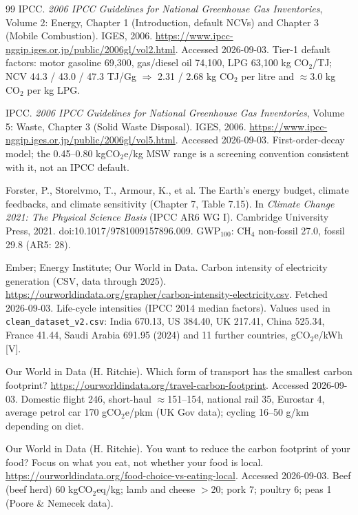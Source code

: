 \documentclass[11pt,a4paper]{article}
\begin{document}
\begin{thebibliography}{99}
IPCC. \textit{2006 IPCC Guidelines for National Greenhouse Gas Inventories}, Volume 2: Energy, Chapter 1 (Introduction, default NCVs) and Chapter 3 (Mobile Combustion). IGES, 2006.
\url{https://www.ipcc-nggip.iges.or.jp/public/2006gl/vol2.html}. Accessed 2026-09-03.
Tier-1 default factors: motor gasoline 69{,}300, gas/diesel oil 74{,}100, LPG 63{,}100 kg CO$_2$/TJ; NCV 44.3 / 43.0 / 47.3 TJ/Gg $\Rightarrow$ 2.31 / 2.68 kg CO$_2$ per litre and $\approx$3.0 kg CO$_2$ per kg LPG.

IPCC. \textit{2006 IPCC Guidelines for National Greenhouse Gas Inventories}, Volume 5: Waste, Chapter 3 (Solid Waste Disposal). IGES, 2006.
\url{https://www.ipcc-nggip.iges.or.jp/public/2006gl/vol5.html}. Accessed 2026-09-03.
First-order-decay model; the 0.45--0.80 kgCO$_2$e/kg MSW range is a screening convention consistent with it, not an IPCC default.

Forster, P., Storelvmo, T., Armour, K., et al. The Earth's energy budget, climate feedbacks, and climate sensitivity (Chapter 7, Table 7.15).
In \textit{Climate Change 2021: The Physical Science Basis} (IPCC AR6 WG I). Cambridge University Press, 2021. doi:10.1017/9781009157896.009.
GWP$_{100}$: CH$_4$ non-fossil 27.0, fossil 29.8 (AR5: 28).

Ember; Energy Institute; Our World in Data. Carbon intensity of electricity generation (CSV, data through 2025).
\url{https://ourworldindata.org/grapher/carbon-intensity-electricity.csv}. Fetched 2026-09-03.
Life-cycle intensities (IPCC 2014 median factors). Values used in \texttt{clean\_dataset\_v2.csv}: India 670.13, US 384.40, UK 217.41, China 525.34, France 41.44, Saudi Arabia 691.95 (2024) and 11 further countries, gCO$_2$e/kWh [V].

Our World in Data (H. Ritchie). Which form of transport has the smallest carbon footprint?
\url{https://ourworldindata.org/travel-carbon-footprint}. Accessed 2026-09-03.
Domestic flight 246, short-haul $\approx$151--154, national rail 35, Eurostar 4, average petrol car 170 gCO$_2$e/pkm (UK Gov data); cycling 16--50 g/km depending on diet.

Our World in Data (H. Ritchie). You want to reduce the carbon footprint of your food? Focus on what you eat, not whether your food is local.
\url{https://ourworldindata.org/food-choice-vs-eating-local}. Accessed 2026-09-03.
Beef (beef herd) 60 kgCO$_2$eq/kg; lamb and cheese $>$20; pork 7; poultry 6; peas 1 (Poore \& Nemecek data).


\end{thebibliography}
\end{document}
